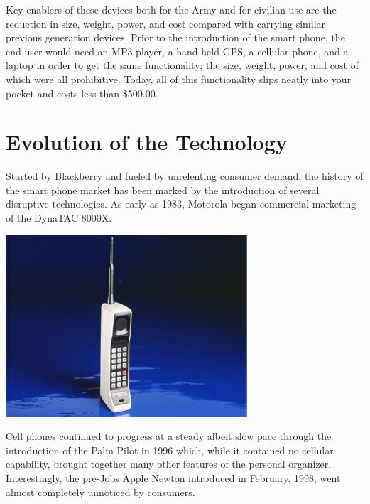 \documentclass[letterpaper,12pt]{article}
\begin{document}
Key enablers of these devices both for the Army and for civilian use are the reduction in size, weight, power, and cost compared with carrying similar previous generation devices.  Prior to the introduction of the smart phone, the end user would need an MP3 player, a hand held GPS, a cellular phone, and a laptop in order to get the same functionality; the size, weight, power, and cost of which were all prohibitive.  Today, all of this functionality slips neatly into your pocket and costs less than \$500.00.

\section*{Evolution of the Technology}
Started by Blackberry and fueled by unrelenting consumer demand, the history of the smart phone market has been marked by the introduction of several disruptive technologies.  As early as 1983, Motorola began commercial marketing of the DynaTAC 8000X.  

\begin{center}
\includegraphics[scale=0.8]{images/dynaTac8000}
\end{center}

Cell phones continued to progress at a steady albeit slow pace through the introduction of the Palm Pilot in 1996 which, while it contained no cellular capability, brought together many other features of the personal organizer.  Interestingly, the pre-Jobs Apple Newton introduced in February, 1998, went almost completely unnoticed by consumers.  
\end{document}
